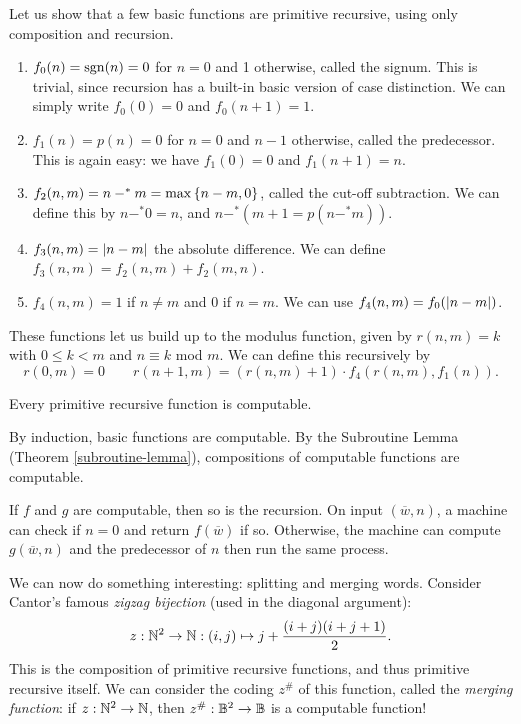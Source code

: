 \documentclass{article}
\begin{document}
Let us show that a few basic functions are primitive recursive, using only composition and recursion.
\begin{enumerate}
	\item $f_0(n) = \operatorname{sgn}(n) = 0$ for $n = 0$ and 1 otherwise, called the signum. This is trivial, since recursion has a built-in basic version of case distinction. We can simply write $f_0(0) = 0$ and $f_0(n + 1) = 1$.
	\item $f_1(n) = p(n) = 0$ for $n = 0$ and $n-1$ otherwise, called the predecessor. This is again easy: we have $f_1(0) = 0$ and $f_1(n + 1) = n$.
	\item $f_2(n, m) = n -^* m = \max \left\lbrace n - m, 0 \right\rbrace$, called the cut-off subtraction. We can define this by $n -^* 0 = n$, and $n -^* (m + 1 = p(n -^* m))$.
	\item $f_3(n, m) = \left\lvert n - m \right\rvert$ the absolute difference. We can define $f_3(n, m) = f_2(n, m) + f_2(m, n)$.
	\item $f_4(n, m) = 1$ if $n \neq m$ and 0 if $n = m$. We can use $f_4(n, m) = f_0(\left\lvert n - m \right\rvert)$.
\end{enumerate}
These functions let us build up to the modulus function, given by $r(n, m) = k$ with $0 \leq k < m$ and $n \equiv k$ mod $m$. We can define this recursively by
\[
	r(0, m) = 0 \qquad r(n + 1, m) = (r(n,m) + 1) \cdot f_4(r(n, m), f_1(n)).
\]

\begin{theorem}
	\label{prim-rec-computable}
	Every primitive recursive function is computable.
\end{theorem}

\begin{prf}
	By induction, basic functions are computable. By the Subroutine Lemma (Theorem \ref{subroutine-lemma}), compositions of computable functions are computable.
	    
	If $f$ and $g$ are computable, then so is the recursion. On input $(\overline w, n)$, a machine can check if $n = 0$ and return $f(\overline w)$ if so. Otherwise, the machine can compute $g(\overline w, n)$ and the predecessor of $n$ then run the same process.
\end{prf}

We can now do something interesting: splitting and merging words. Consider Cantor's  famous \textit{zigzag bijection} (used in the diagonal argument):
\[
	z: \mathbb{N}^2 \to \mathbb{N} : (i, j) \mapsto j + \frac{(i+j)(i+j+1)}{2}.
\]
This is the composition of primitive recursive functions, and thus primitive recursive itself. We can consider the coding $z^\#$ of this function, called the \textit{merging function}: if $z : \mathbb{N}^2 \to \mathbb{N}$, then $z^\# : \mathbb{B}^2 \to \mathbb{B}$ is a computable function!
\end{document}
